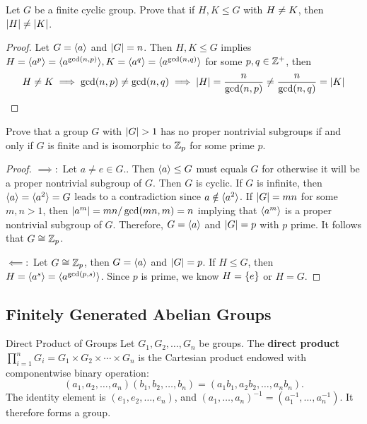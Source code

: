 \documentclass[12pt,a4paper]{article}
\begin{document}
    \begin{ex}
        Let $G$ be a finite cyclic group. Prove that if $H,K\leq G$ with $H\neq K$, then $\left\lvert H \right\rvert\neq\left\lvert K \right\rvert$.
    \end{ex}
    \begin{proof}
        Let $G=\langle a \rangle$ and $\left\lvert G \right\rvert=n$. Then $H,K\leq G$ implies $H=\langle a^p \rangle=\langle a^{\gcd(n,p)} \rangle,K=\langle a^q \rangle=\langle a^{\gcd(n,q)} \rangle$ for some $p,q\in\mathbb{Z}^+$, then 
        \[
            H\neq K\implies\gcd(n,p)\neq\gcd(n,q)\implies\left\lvert H \right\rvert=\frac{n}{\gcd(n,p)}\neq\frac{n}{\gcd(n,q)}=\left\lvert K \right\rvert
        \]
    \end{proof}
    \bigskip

    \begin{ex}
        Prove that a group $G$ with $\left\lvert G \right\rvert>1$ has no proper nontrivial subgroups if and only if $G$ is finite and is isomorphic to $\mathbb{Z}_p$ for some prime $p$.
    \end{ex}
    \begin{proof}
        $\implies:$ Let $a\neq e\in G$.. Then $\langle a \rangle\leq G$ must equals $G$ for otherwise it will be a proper nontrivial subgroup of $G$. Then $G$ is cyclic. If $G$ is infinite, then $\langle a \rangle=\langle a^2 \rangle=G$ leads to a contradiction since $a\notin\langle a^2 \rangle$. If $\left\lvert G \right\rvert=mn$ for some $m,n>1$, then $\left\lvert a^m \right\rvert=mn/\gcd(mn,m)=n$ implying that $\langle a^m \rangle$ is a proper nontrivial subgroup of $G$. Therefore, $G=\langle a \rangle$ and $\left\lvert G \right\rvert=p$ with $p$ prime. It follows that $G\cong\mathbb{Z}_p$.

        $\impliedby:$ Let $G\cong\mathbb{Z}_p$, then $G=\langle a \rangle$ and $\left\lvert G \right\rvert=p$. If $H\leq G$, then $H=\langle a^s \rangle=\langle a^{\gcd(p,s)} \rangle$. Since $p$ is prime, we know $H=\left\{ e \right\}$ or $H=G$.
    \end{proof}
    
    \subsection{Finitely Generated Abelian Groups}
    
    \begin{defi}{Direct Product of Groups}
        Let $G_1, G_2, \ldots, G_n$ be groups. The \textbf{direct product} $\prod_{i=1}^n G_i = G_1 \times G_2 \times \cdots \times G_n$ is the Cartesian product endowed with componentwise binary operation:
        \[
            (a_1, a_2, \ldots, a_n)(b_1, b_2, \ldots, b_n) = (a_1 b_1, a_2 b_2, \ldots, a_n b_n).
        \]
        The identity element is $(e_1, e_2, \ldots, e_n)$, and $(a_1, \ldots, a_n)^{-1} = (a_1^{-1}, \ldots, a_n^{-1})$. It therefore forms a group.
    \end{defi}
    \bigskip
\end{document}
